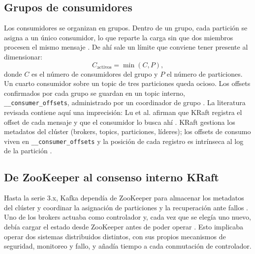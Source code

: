 \documentclass[11pt,a4paper]{article}
\begin{document}
\subsection{Grupos de consumidores}

Los consumidores se organizan en grupos. Dentro de un grupo, cada partición se asigna a un único consumidor, lo que reparte la carga sin que dos miembros procesen el mismo mensaje \cite{raptis2023survey,kafkadocs}. De ahí sale un límite que conviene tener presente al dimensionar:
\begin{equation}
C_{\text{activos}} = \min(C, P),
\end{equation}
donde $C$ es el número de consumidores del grupo y $P$ el número de particiones. Un cuarto consumidor sobre un topic de tres particiones queda ocioso. Los offsets confirmados por cada grupo se guardan en un topic interno, \texttt{\_\_consumer\_offsets}, administrado por un coordinador de grupo \cite{kafkadocs}. La literatura revisada contiene aquí una imprecisión: Lu et al. afirman que KRaft registra el offset de cada mensaje y que el consumidor lo busca ahí \cite{lu2025proposal}. KRaft gestiona los metadatos del clúster (brokers, topics, particiones, líderes); los offsets de consumo viven en \texttt{\_\_consumer\_offsets} y la posición de cada registro es intrínseca al log de la partición \cite{kip500,kafkadocs}.

\subsection{De ZooKeeper al consenso interno KRaft}

Hasta la serie 3.x, Kafka dependía de ZooKeeper para almacenar los metadatos del clúster y coordinar la asignación de particiones y la recuperación ante fallos \cite{zhou2024distributed,calderon2024monitoring}. Uno de los brokers actuaba como controlador y, cada vez que se elegía uno nuevo, debía cargar el estado desde ZooKeeper antes de poder operar \cite{kip500}. Esto implicaba operar dos sistemas distribuidos distintos, con sus propios mecanismos de seguridad, monitoreo y fallo, y añadía tiempo a cada conmutación de controlador.
\end{document}
